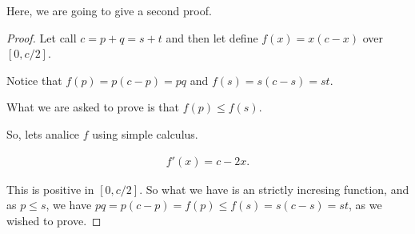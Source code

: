     Here, we are going to give a second proof.
    
    \begin{proof}
        Let call $c = p + q = s + t$ and then let define $f(x) = x(c-x)$ over $[0, c/2]$.\pn
        
        Notice that $f(p) = p(c-p) = pq$ and $f(s) = s(c-s) = st$.\pn
            
        What we are asked to prove is that $f(p) \leq f(s)$.\pn
        
        So, lets analice $f$ using simple calculus.\pn
        
        \begin{align}
            f'(x) = c-2x.
        \end{align}
        
        This is positive in $[0, c/2]$. So what we have is an strictly incresing function, and as $p \leq s$, we have 
        $pq = p(c-p) = f(p) \leq f(s) = s(c-s) = st$, as we wished to prove. 
    \end{proof}